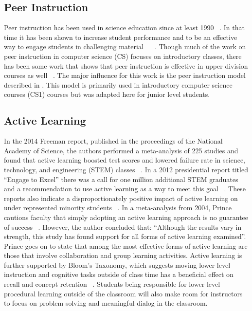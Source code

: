 \documentclass[12pt]{article}
\begin{document}
\subsection{Peer Instruction}
Peer instruction has been used in science education since at least 1990 ~\cite{crouchPeerInstructionTen2001}. In that time it has been shown to increase student performance and to be an effective way to engage students in challenging material ~\cite{simonExperienceReportPeer2010a} ~\cite{porterMultiinstitutionalStudyPeer2016}. Though much of the work on peer instruction in computer science (CS) focuses on introductory classes, there has been some work that shows that peer instruction is effective in upper division courses as well ~\cite{leeCanPeerInstruction2013}.
The major influence for this work is the peer instruction model described in \cite{porterPeerInstructionStudents2011}. This model is primarily used in introductory computer science courses (CS1) courses but was adapted here for junior level students. 

\subsection{Active Learning}
In the 2014 Freeman report, published in the proceedings of the National Academy of Science, the authors performed a meta-analysis of 225 studies and found that active learning boosted test scores and lowered failure rate in science, technology, and engineering (STEM) classes ~\cite{freemanActiveLearningIncreases2014}. In a 2012 presidential report titled ``Engage to Excel'' there was a call for one million additional STEM graduates and a recommendation to use active learning as a way to meet this goal ~\cite{gatesEngageExcel2012}. These reports also indicate a disproportionately positive impact of active learning on under represented minority students ~\cite{freemanActiveLearningIncreases2014}.
In a meta-analysis from 2004, Prince cautions faculty that simply adopting an active learning approach is no guarantee of success ~\cite{princeDoesActiveLearning2004}. However, the author concluded that: ``Although the results vary in strength, this study has found support for all forms of active learning examined''. Prince goes on to state that among the most effective forms of active learning are those that involve collaboration and group learning activities.
Active learning is further supported by Bloom’s Taxonomy, which suggests moving lower level instruction and cognitive tasks outside of class time has a beneficial effect on recall and concept retention ~\cite{andersonTaxonomyLearningTeaching2014}. Students being responsible for lower level procedural learning outside of the classroom will also make room for instructors to focus on problem solving and meaningful dialog in the classroom.
\end{document}
